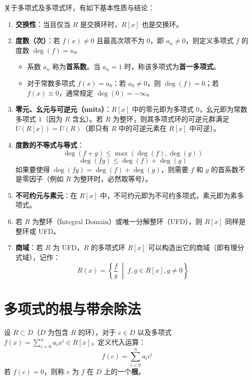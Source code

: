 \documentclass[11pt]{article}
\begin{document}
关于多项式及多项式环，有如下基本性质与结论：
\begin{cnproperty}[多项式的基本概念与性质]
\begin{enumerate}
    \item \textbf{交换性}：当且仅当 $R$ 是交换环时，$R[x]$ 也是交换环。
    \item \textbf{度数（次）}：若 $f(x) \neq 0$ 且最高次项不为 $0$，即 $a_n \neq 0$，则定义多项式 $f$ 的度数 $\deg(f) = n$。
    \begin{itemize}
        \item 系数 $a_n$ 称为\textbf{首系数}。当 $a_n = 1$ 时，称该多项式为\textbf{首一多项式}。
        \item 对于常数多项式 $f(x) = a_0$：若 $a_0 \neq 0$，则 $\deg(f) = 0$；若 $f(x) \equiv 0$，通常规定 $\deg(0) = -\infty$。
    \end{itemize}
    \item \textbf{零元、幺元与可逆元（units）}：$R[x]$ 中的零元即为多项式 $0$，幺元即为常数多项式 $1$（因为 $R$ 含幺）。若 $R$ 为整环，则其多项式环的可逆元群满足 $U(R[x]) = U(R)$（即只有 $R$ 中的可逆元素在 $R[x]$ 中可逆）。
    \item \textbf{度数的不等式与等式}：
    $$ \deg(f + g) \le \max(\deg(f), \deg(g)) $$
    $$ \deg(fg) \le \deg(f) + \deg(g) $$
    如果要使得 $\deg(fg) = \deg(f) + \deg(g)$，则需要 $f$ 和 $g$ 的首系数不是零因子（例如 $R$ 为整环时，必然取等号）。
    \item \textbf{不可约元与素元}：在 $R[x]$ 中，不可约元即为不可约多项式，素元即为素多项式。
    \item {} 若 $R$ 为整环（Integral Domain）或唯一分解整环（UFD），则 $R[x]$ 同样是整环或 UFD。
    \item \textbf{商域}：若 $R$ 为 UFD，$R$ 的多项式环 $R[x]$ 可以构造出它的商域（即有理分式域），记作：
    $$ R(x) = \left\{ \frac{f}{g} \;\middle|\; f, g \in R[x], g \neq 0 \right\} $$
\end{enumerate}
\end{cnproperty}

\section{多项式的根与带余除法}

\begin{cndefinition}[多项式的根]
设 $R \subset D$（$D$ 为包含 $R$ 的环），对于 $c \in D$ 以及多项式 $f(x) = \sum_{i=0}^n a_i x^i \in R[x]$，定义代入运算：
$$ f(c) = \sum_{i=0}^n a_i c^i $$
若 $f(c) = 0$，则称 $c$ 为 $f$ 在 $D$ 上的一个\textbf{根}。
\end{cndefinition}
\end{document}
